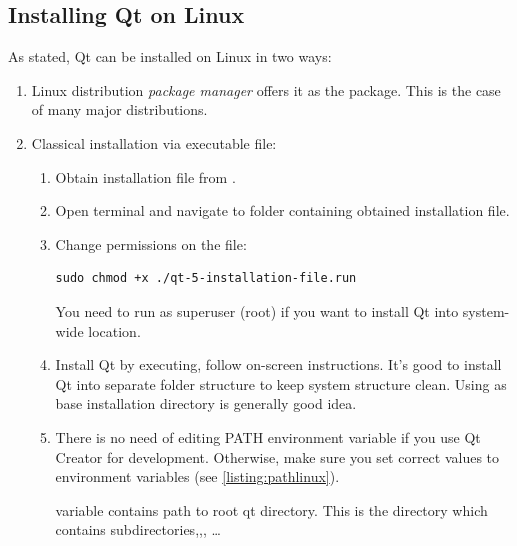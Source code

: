 \subsection{Installing Qt on Linux}
As stated, Qt can be installed on Linux in two ways:
\begin{enumerate}
\item Linux distribution \textit{package manager} offers it as the package. This is the case of many major distributions.
\item Classical installation via executable file:
\begin{enumerate}
\item Obtain installation file from \citep{various:qthome}.
\item Open terminal and navigate to folder containing obtained installation file.
\item Change permissions on the file:
\begin{lstlisting}[firstnumber=1,language=text]
sudo chmod +x ./qt-5-installation-file.run
\end{lstlisting}
You need to run as superuser (root) if you want to install Qt into system-wide location.

\item Install Qt by executing, follow on-screen instructions. It's good to install Qt into separate folder structure to keep system structure clean. Using as base installation directory is generally good idea.

\item There is no need of editing PATH environment variable if you use Qt Creator for development. Otherwise, make sure you set correct values to environment variables (see \autoref{listing:pathlinux}).
 variable contains path to root qt directory. This is the directory which contains subdirectories,,, \ldots
\end{enumerate}
\end{enumerate}

